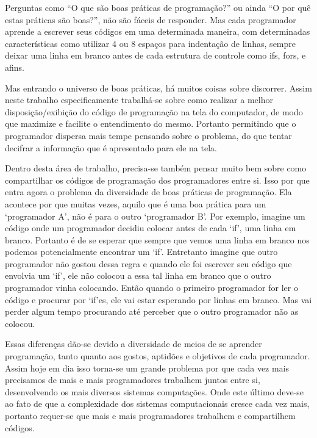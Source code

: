 { %




    Perguntas como ``O que são boas práticas de programação?'' ou ainda ``O por quê estas práticas
    são boas?'', não são fáceis de responder. Mas cada programador aprende a escrever seus códigos
    em uma determinada maneira, com determinadas características como utilizar 4 ou 8 espaços para
    indentação de linhas, sempre deixar uma linha em branco antes de cada estrutura de controle como
    if\textquotesingle s, for\textquotesingle s, e afins.

    Mas entrando o universo de boas práticas, há muitos coisas sobre discorrer. Assim neste trabalho
    especificamente trabalhá-se sobre como realizar a melhor disposição/exibição do código de
    programação na tela do computador, de modo que maximize e facilite o entendimento do mesmo.
    Portanto permitindo que o programador dispersa mais tempe pensando sobre o problema, do que
    tentar decifrar a informação que é apresentado para ele na tela.

    Dentro desta área de trabalho, precisa-se também pensar muito bem sobre como compartilhar os
    códigos de programação dos programadores entre si. Isso por que entra agora o problema da
    diversidade de boas práticas de programação. Ela acontece por que muitas vezes, aquilo que é uma
    boa prática para um `programador A', não é para o outro `programador B'. Por exemplo, imagine um
    código onde um programador decidiu colocar antes de cada `if', uma linha em branco. Portanto é
    de se esperar que sempre que vemos uma linha em branco nos podemos potencialmente encontrar um
    `if'. Entretanto imagine que outro programador não gostou dessa regra e quando ele foi escrever
    seu código que envolvia um `if', ele não colocou a essa tal linha em branco que o outro
    programador vinha colocando. Então quando o primeiro programador for ler o código e procurar por
    `if'es, ele vai estar esperando por linhas em branco. Mas vai perder algum tempo procurando até
    perceber que o outro programador não as colocou.

    Essas diferenças dão-se devido a diversidade de meios de se aprender programação, tanto quanto
    aos gostos, aptidões e objetivos de cada programador. Assim hoje em dia isso torna-se um grande
    problema por que cada vez mais precisamos de mais e mais programadores trabalhem juntos entre
    si, desenvolvendo os mais diversos sistemas computações. Onde este último deve-se ao fato de que
    a complexidade dos sistemas computacionais cresce cada vez mais, portanto requer-se que mais e
    mais programadores trabalhem e compartilhem códigos.

}
